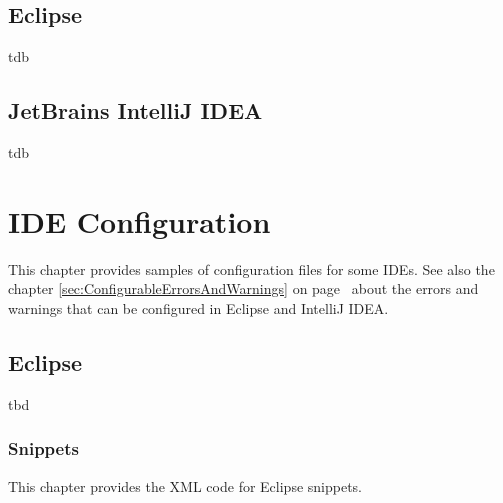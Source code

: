 \documentclass[11pt,a4paper, titlepage, parskip=half, headsepline, footsepline, cleardoublepage=current, headheight=1cm]{scrbook}
\newcommand*{\tqvref}[1]{\hyperref[{#1}]{\ref*{#1}} on page~\pageref{#1}}
\begin{document}
\subsection{Eclipse}\label{sec:EclipseErrorsAndWarnings}
tdb

\subsection{JetBrains IntelliJ IDEA}\label{sec:IntelliJErrorsAndWarnings}
tdb

\section{IDE Configuration}\label{sec:IDEConfiguration}
This chapter provides samples of configuration files for some IDEs. See also the chapter \tqvref{sec:ConfigurableErrorsAndWarnings} about the errors and warnings that can be configured in Eclipse and IntelliJ IDEA.

\subsection{Eclipse}\label{sec:EclipseConfiguration}
tbd

\subsubsection{Snippets}
This chapter provides the XML code for Eclipse snippets.
\end{document}
